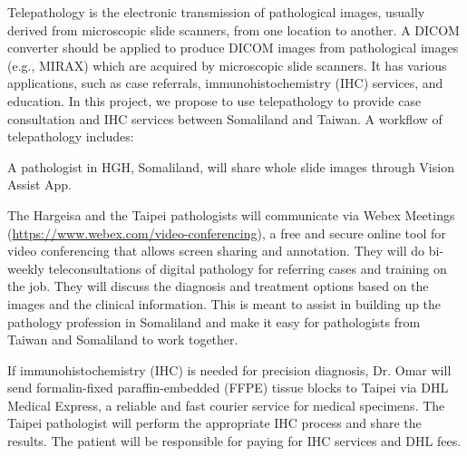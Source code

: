 \documentclass{article}
\begin{document}
\begin{outline}
    \2 Telepathology is the electronic transmission of pathological images, usually derived from microscopic slide scanners, from one location to another. A DICOM converter should be applied to produce DICOM images from pathological images (e.g., MIRAX) which are acquired by microscopic slide scanners. It has various applications, such as case referrals, immunohistochemistry (IHC) services, and education. In this project, we propose to use telepathology to provide case consultation and IHC services between Somaliland and Taiwan. A workflow of telepathology includes:


	\3 A pathologist in HGH, Somaliland, will share whole slide images through Vision Assist App.
    

    \3 The Hargeisa and the Taipei pathologists will communicate via Webex Meetings (\url{https://www.webex.com/video-conferencing}), a free and secure online tool for video conferencing that allows screen sharing and annotation. They will do bi-weekly teleconsultations of digital pathology for referring cases and training on the job. They will discuss the diagnosis and treatment options based on the images and the clinical information. This is meant to assist in building up the pathology profession in Somaliland and make it easy for pathologists from Taiwan and Somaliland to work together.
    
    \3 If immunohistochemistry (IHC) is needed for precision diagnosis, Dr. Omar will send formalin-fixed paraffin-embedded (FFPE) tissue blocks to Taipei via DHL Medical Express, a reliable and fast courier service for medical specimens. The Taipei pathologist will perform the appropriate IHC process and share the results. The patient will be responsible for paying for IHC services and DHL fees.


\end{outline}
\end{document}

